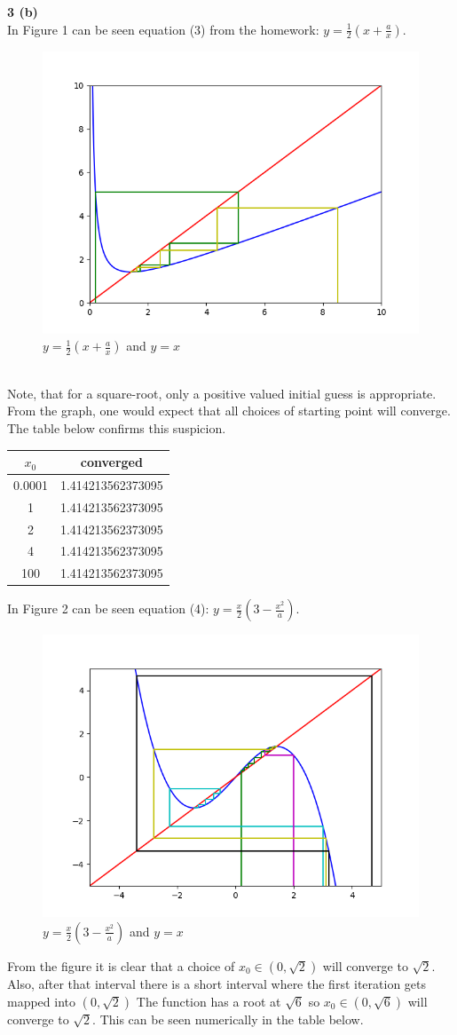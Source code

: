 \documentclass[12pt]{article}
\newcommand{\problem}[1]{\hspace{-4 ex} \large \textbf{#1}\\}
\begin{document}
\problem{3 (b)}
	In Figure 1 can be seen equation (3) from the homework: $y=\frac{1}{2}(x+\frac{a}{x})$.
	\begin{figure}[h]
		\caption{$y=\frac{1}{2}(x+\frac{a}{x})$ and $y=x$}
		\centering
		\includegraphics[width=.5\textwidth]{hw2_figure_1}
	\end{figure}\\
	Note, that for a square-root, only a positive valued initial guess is appropriate. From the graph, one would expect that all choices of starting point will converge. The table below confirms this suspicion. 
	\begin{center}
		\begin{tabular}{|c|c|}
			\hline
			$x_0$&converged\\ \hline
			0.0001&1.414213562373095\\ \hline
			1&1.414213562373095\\ \hline
			2&1.414213562373095\\ \hline
			4&1.414213562373095\\ \hline
			100&1.414213562373095\\ \hline
		\end{tabular}
	\end{center}
	
	In Figure 2 can be seen equation (4): $y=\frac{x}{2}(3-\frac{x^2}{a})$.
	\begin{figure}[h]
		\caption{$y=\frac{x}{2}(3-\frac{x^2}{a})$ and $y=x$}
		\centering
		\includegraphics[width=.75\textwidth]{hw2_figure_2}
	\end{figure}
	From the figure it is clear that a choice of $x_0 \in (0,\sqrt{2})$ will converge to $\sqrt{2}$. Also, after that interval there is a short interval where the first iteration gets mapped into $(0,\sqrt{2})$ The function has a root at $\sqrt{6}$ so $x_0 \in (0,\sqrt{6})$ will converge to $\sqrt{2}$. This can be seen numerically in the table below.
	
\end{document}
